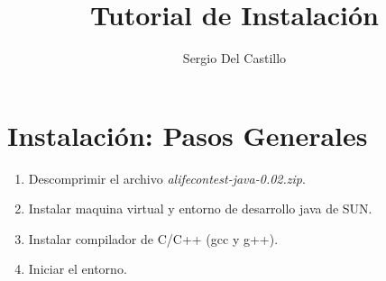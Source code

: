 \documentclass[11pt,a4paper]{article}
\author{Sergio Del Castillo}
\title{Tutorial de Instalación}
\begin{document}
 \maketitle
 \tableofcontents{}
 \newpage
 
\section{Instalación: Pasos Generales}
	\begin{enumerate}
		\item Descomprimir el archivo \textsl{alifecontest-java-0.02.zip}.
		\item Instalar maquina virtual y entorno de desarrollo java de SUN.
		\item Instalar compilador de C/C++ (gcc y g++).
		\item Iniciar el entorno.
	\end{enumerate}
\end{document}
